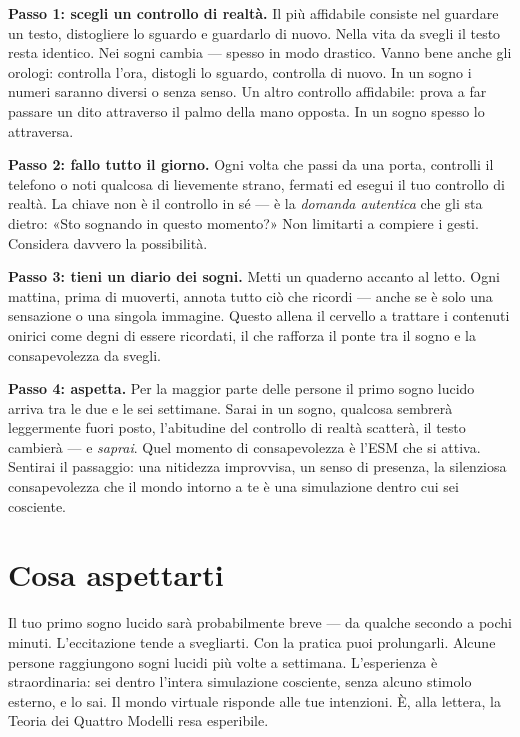 \documentclass[11pt, twoside, openright]{book}
\begin{document}
\textbf{Passo 1: scegli un controllo di realtà.} Il più affidabile consiste nel guardare un testo, distogliere lo sguardo e guardarlo di nuovo. Nella vita da svegli il testo resta identico. Nei sogni cambia --- spesso in modo drastico. Vanno bene anche gli orologi: controlla l'ora, distogli lo sguardo, controlla di nuovo. In un sogno i numeri saranno diversi o senza senso. Un altro controllo affidabile: prova a far passare un dito attraverso il palmo della mano opposta. In un sogno spesso lo attraversa.

\textbf{Passo 2: fallo tutto il giorno.} Ogni volta che passi da una porta, controlli il telefono o noti qualcosa di lievemente strano, fermati ed esegui il tuo controllo di realtà. La chiave non è il controllo in sé --- è la \textit{domanda autentica} che gli sta dietro: «Sto sognando in questo momento?» Non limitarti a compiere i gesti. Considera davvero la possibilità.

\textbf{Passo 3: tieni un diario dei sogni.} Metti un quaderno accanto al letto. Ogni mattina, prima di muoverti, annota tutto ciò che ricordi --- anche se è solo una sensazione o una singola immagine. Questo allena il cervello a trattare i contenuti onirici come degni di essere ricordati, il che rafforza il ponte tra il sogno e la consapevolezza da svegli.

\textbf{Passo 4: aspetta.} Per la maggior parte delle persone il primo sogno lucido arriva tra le due e le sei settimane. Sarai in un sogno, qualcosa sembrerà leggermente fuori posto, l'abitudine del controllo di realtà scatterà, il testo cambierà --- e \textit{saprai}. Quel momento di consapevolezza è l'ESM che si attiva. Sentirai il passaggio: una nitidezza improvvisa, un senso di presenza, la silenziosa consapevolezza che il mondo intorno a te è una simulazione dentro cui sei cosciente.

\section*{Cosa aspettarti}

Il tuo primo sogno lucido sarà probabilmente breve --- da qualche secondo a pochi minuti. L'eccitazione tende a svegliarti. Con la pratica puoi prolungarli. Alcune persone raggiungono sogni lucidi più volte a settimana. L'esperienza è straordinaria: sei dentro l'intera simulazione cosciente, senza alcuno stimolo esterno, e lo sai. Il mondo virtuale risponde alle tue intenzioni. È, alla lettera, la Teoria dei Quattro Modelli resa esperibile.
\end{document}
